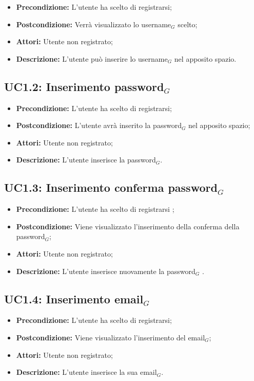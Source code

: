 \begin{itemize}
	\item \textbf{Precondizione:} L'utente ha scelto di registrarsi;
	\item \textbf{Postcondizione:} Verrà visualizzato lo username$_G$ scelto;
	\item \textbf{Attori:} Utente non registrato;
	\item \textbf{Descrizione:} L'utente può inserire lo username$_G$ nel apposito spazio.
\end{itemize}
\subsection{ UC1.2: Inserimento password$_G$}

\begin{itemize}
	\item \textbf{Precondizione:} L'utente ha scelto di registrarsi;
	\item \textbf{Postcondizione:} L'utente avrà inserito la password$_G$ nel apposito spazio;
	\item \textbf{Attori:} Utente non registrato;
	\item \textbf{Descrizione:} L'utente inserisce la password$_G$.
\end{itemize}
\subsection{ UC1.3: Inserimento conferma password$_G$}

\begin{itemize}
	\item \textbf{Precondizione:} L'utente ha scelto di registrarsi ;
	\item \textbf{Postcondizione:} Viene visualizzato l'inserimento della conferma della password$_G$;
	\item \textbf{Attori:} Utente non registrato;
	\item \textbf{Descrizione:} L'utente inserisce nuovamente la password$_G$ .
\end{itemize}
\subsection{ UC1.4: Inserimento email$_G$}

\begin{itemize}
	\item \textbf{Precondizione:} L'utente ha scelto di registrarsi;
	\item \textbf{Postcondizione:} Viene visualizzato l'inserimento del email$_G$;
	\item \textbf{Attori:} Utente non registrato;
	\item \textbf{Descrizione:} L'utente inserisce la sua email$_G$.
\end{itemize}
